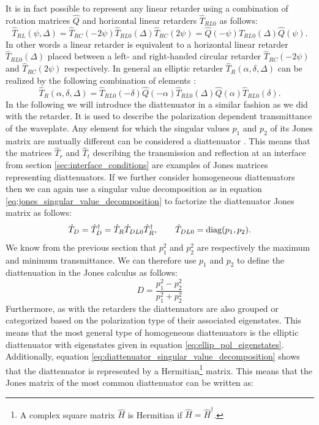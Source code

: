 It is in fact possible to represent any linear retarder using a combination of rotation matrices $\hat{Q}$ and horizontal linear retarders $\hat{T}_{RL0}$ as follows:
\begin{equation}
    \hat{T}_{RL}(\psi, \Delta)=\hat{T}_{RC}(-2\psi)\hat{T}_{RL0}(\Delta)\hat{T}_{RC}(2\psi)=
    \hat{Q}(-\psi)\hat{T}_{RL0}(\Delta)\hat{Q}(\psi).
\end{equation}
In other words a linear retarder is equivalent to a horizontal linear retarder $\hat{T}_{RL0}(\Delta)$ placed between a left- and right-handed circular retarder $\hat{T}_{RC}(-2\psi)$ and $\hat{T}_{RC}(2\psi)$ respectively. In general an elliptic retarder $\hat{T}_R(\alpha, \delta, \Delta)$ can be realized by the following combination of elements \cite{GilPerez2017PolarizedApproach}:
\begin{equation}
    \hat{T}_R(\alpha, \delta, \Delta)=
    \hat{T}_{RL0}(-\delta)\hat{Q}(-\alpha)\hat{T}_{RL0}(\Delta)\hat{Q}(\alpha)\hat{T}_{RL0}(\delta).
\end{equation}
In the following we will introduce the diattenuator in a similar fashion as we did with the retarder. It is used to describe the polarization dependent transmittance of the waveplate. Any element for which the singular values $p_1$ and $p_2$ of its Jones matrix are mutually different can be considered a diattenuator \cite{Savenkov2005ConditionsBirefringent}. This means that the matrices $\hat{T}_r$ and $\hat{T}_t$ describing the transmission and reflection at an interface from section \ref{sec:interface_conditions} are examples of Jones matrices representing diattenuators. If we further consider homogeneous diattenuators then we can again use a singular value decomposition as in equation \ref{eq:jones_singular_value_decomposition} to factorize the diattenuator Jones matrix as follows:
\begin{equation}
    \label{eq:diattenuator_singular_value_decomposition}
    \hat{T}_D = \hat{T}_D^{\dagger} = \hat{T}_R\hat{T}_{DL0}\hat{T}_R^{\dagger}, 
    \qquad 
    \hat{T}_{DL0}=\operatorname{diag}(p_1, p_2).
\end{equation}
We know from the previous section that $p_1^2$ and $p_2^2$ are respectively the maximum and minimum transmittance. We can therefore use $p_1$ and $p_2$ to define the diattenuation in the Jones calculus as follows: 
\begin{equation}
    \label{eq:diattenuation_1}
    D = \frac{p_1^2-p_2^2}{p_1^2+p_2^2}
\end{equation}
Furthermore, as with the retarders the diattenuators are also grouped or categorized based on the polarization type of their associated eigenstates. This means that the most general type of homogeneous diattenuators is the elliptic diattenuator with eigenstates given in equation \ref{eq:ellip_pol_eigenstates}. Additionally, equation \ref{eq:diattenuator_singular_value_decomposition} shows that the diattenuator is represented by a Hermitian\footnote{A complex square matrix $\hat{H}$ is Hermitian if $\hat{H}=\hat{H}^{\dagger}$.} matrix. This means that the Jones matrix of the most common diattenuator can be written as:
